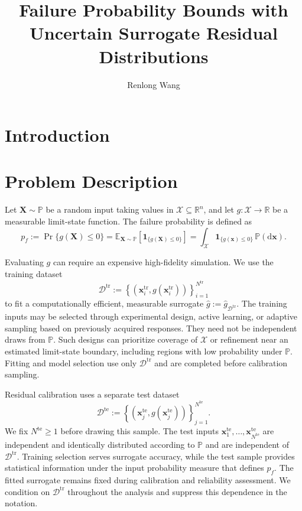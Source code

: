 \documentclass[review,11pt,3p,authoryear,nopreprintline]{elsarticle}
\begin{document}
\begin{frontmatter}
  \title{Failure Probability Bounds with Uncertain Surrogate Residual Distributions}

  \author[inst1]{Renlong Wang}

  \begin{abstract}
  \end{abstract}

  \begin{keyword}
  \end{keyword}
\end{frontmatter}

\section{Introduction}

\section{Problem Description}
\label{sec-problem}

Let $\bm X\sim\mathbb P$ be a random input taking values in $\mathcal X\subseteq\mathbb R^n$, and let $g:\mathcal X\to\mathbb R$ be a measurable limit-state function. The failure probability is defined as
\[
  p_f:=\Pr\{g(\bm X)\le0\}=\mathbb E_{\bm X\sim\mathbb P}\left[\mathbf 1_{\{g(\bm X)\le0\}}\right]=\int_{\mathcal X}\mathbf 1_{\{g(\bm x)\le0\}}\,\mathbb P(\mathrm d\bm x).
\]

Evaluating $g$ can require an expensive high-fidelity simulation. We use the training dataset
\[
  \mathcal D^{\mathrm{tr}}:=\left\{\left(\bm x_i^{\mathrm{tr}},g(\bm x_i^{\mathrm{tr}})\right)\right\}_{i=1}^{N^{\mathrm{tr}}}
\]
to fit a computationally efficient, measurable surrogate $\hat g:=\hat g_{\mathcal D^{\mathrm{tr}}}$. The training inputs may be selected through experimental design, active learning, or adaptive sampling based on previously acquired responses. They need not be independent draws from $\mathbb P$. Such designs can prioritize coverage of $\mathcal X$ or refinement near an estimated limit-state boundary, including regions with low probability under $\mathbb P$. Fitting and model selection use only $\mathcal D^{\mathrm{tr}}$ and are completed before calibration sampling.

Residual calibration uses a separate test dataset
\[
  \mathcal D^{\mathrm{te}}:=\left\{\left(\bm x_j^{\mathrm{te}},g(\bm x_j^{\mathrm{te}})\right)\right\}_{j=1}^{N^{\mathrm{te}}}.
\]
We fix $N^{\mathrm{te}}\ge1$ before drawing this sample. The test inputs $\bm x_1^{\mathrm{te}},\ldots,\bm x_{N^{\mathrm{te}}}^{\mathrm{te}}$ are independent and identically distributed according to $\mathbb P$ and are independent of $\mathcal D^{\mathrm{tr}}$. Training selection serves surrogate accuracy, while the test sample provides statistical information under the input probability measure that defines $p_f$. The fitted surrogate remains fixed during calibration and reliability assessment. We condition on $\mathcal D^{\mathrm{tr}}$ throughout the analysis and suppress this dependence in the notation.
\end{document}
